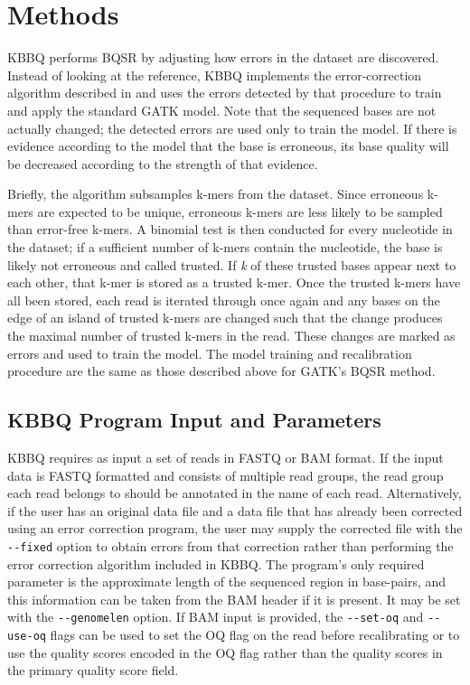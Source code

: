 \section{Methods}
KBBQ performs BQSR by adjusting how errors in the dataset are discovered.
Instead of looking at the reference, KBBQ implements the error-correction algorithm described in \textcite{song_lighter_2014} and uses the errors detected by that procedure to train and apply the standard GATK model. Note that the sequenced bases are not actually changed; the detected errors are used only to train the model. If there is evidence according to the model that the base is erroneous, its base quality will be decreased according to the strength of that evidence.

Briefly, the algorithm subsamples k-mers from the dataset. Since erroneous k-mers are expected to be unique, erroneous k-mers are less likely to be sampled than error-free k-mers. A binomial test is then conducted for every nucleotide in the dataset; if a sufficient number of k-mers contain the nucleotide, the base is likely not erroneous and called trusted. If \textit{k} of these trusted bases appear next to each other, that k-mer is stored as a trusted k-mer. Once the trusted k-mers have all been stored, each read is iterated through once again and any bases on the edge of an island of trusted k-mers are changed such that the change produces the maximal number of trusted k-mers in the read. These changes are marked as errors and used to train the model.
The model training and recalibration procedure are the same as those described above for GATK's BQSR method.

\subsection{KBBQ Program Input and Parameters}

KBBQ requires as input a set of reads in FASTQ \parencite{cock_sanger_2010} or BAM \parencite{li_sequence_2009} format. If the input data is FASTQ formatted and consists of multiple read groups, the read group each read belongs to should be annotated in the name of each read. Alternatively, if the user has an original data file and a data file that has already been corrected using an error correction program, the user may supply the corrected file with the \texttt{-\phantom{}-fixed} option to obtain errors from that correction rather than performing the error correction algorithm included in KBBQ. The program's only required parameter is the approximate length of the sequenced region in base-pairs, and this information can be taken from the BAM header if it is present. It may be set with the \texttt{-\phantom{}-genomelen} option. If BAM input is provided, the \texttt{-\phantom{}-set-oq} and \texttt{-\phantom{}-use-oq} flags can be used to set the OQ flag on the read before recalibrating or to use the quality scores encoded in the OQ flag rather than the quality scores in the primary quality score field.

